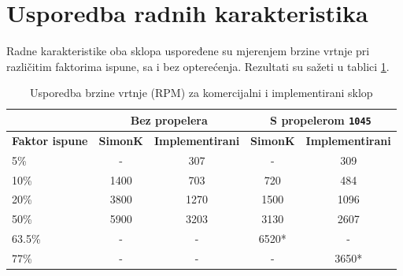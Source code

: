 \documentclass[diplomskirad]{fer}
\begin{document}
\section{Usporedba radnih karakteristika}
\label{sec:usporedba_karakteristika}

Radne karakteristike oba sklopa uspoređene su mjerenjem brzine vrtnje pri
različitim faktorima ispune, sa i bez opterećenja. Rezultati su sažeti u
tablici \ref{tab:usporedba_brzina}.

\begin{table}[h!]
	\centering
	\caption{Usporedba brzine vrtnje (RPM) za komercijalni i implementirani sklop}
	\label{tab:usporedba_brzina}
	\begin{tabular}{|l|c|c|c|c|}
		\hline
		                       & \multicolumn{2}{c|}{\textbf{Bez propelera}} & \multicolumn{2}{c|}{\textbf{S propelerom \texttt{1045}}}                                             \\ \hline
		\textbf{Faktor ispune} & \textbf{SimonK}                             & \textbf{Implementirani}                                  & \textbf{SimonK} & \textbf{Implementirani} \\ \hline
		5\%                    & -                                           & \num{307}                                                & -               & \num{309}               \\ \hline
		10\%                   & \num{1400}                                  & \num{703}                                                & \num{720}       & \num{484}               \\ \hline
		20\%                   & \num{3800}                                  & \num{1270}                                               & \num{1500}      & \num{1096}              \\ \hline
		50\%                   & \num{5900}                                  & \num{3203}                                               & \num{3130}      & \num{2607}              \\ \hline
		63.5\%                 & -                                           & -                                                        & \num{6520}*     & -                       \\ \hline
		77\%                   & -                                           & -                                                        & -               & \num{3650}*             \\ \hline

\end{tabular}
\end{table}
\end{document}
